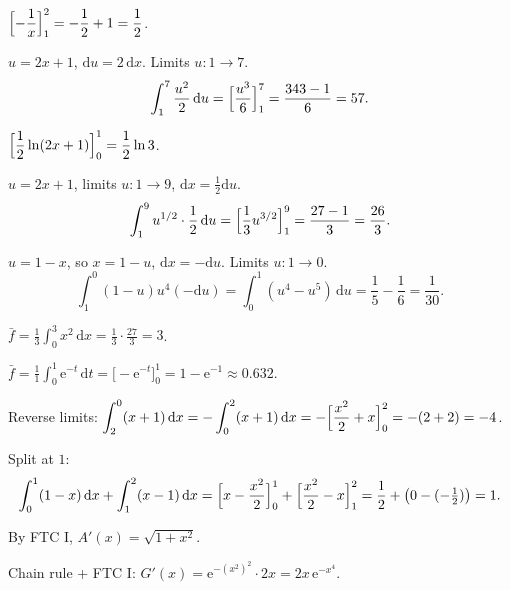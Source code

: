 \begin{solutions}
  \item $\displaystyle\Bigl[-\frac{1}{x}\Bigr]_{1}^{2}
        =-\frac{1}{2}+1=\frac{1}{2}$.

  \item $u=2x+1$, $\mathrm{d}u=2\,\mathrm{d}x$. Limits $u:1\to 7$.
        \[
          \int_{1}^{7} \frac{u^{2}}{2}\,\mathrm{d}u
            =\Bigl[\frac{u^{3}}{6}\Bigr]_{1}^{7}=\frac{343-1}{6}=57 .
        \]

  \item $\displaystyle\Bigl[\frac{1}{2}\ln(2x+1)\Bigr]_{0}^{1}
        =\frac{1}{2}\ln 3$.

  \item $u=2x+1$, limits $u:1\to 9$, $\mathrm{d}x=\frac{1}{2}\mathrm{d}u$.
        \[
          \int_{1}^{9} u^{1/2}\cdot\frac{1}{2}\,\mathrm{d}u
            =\Bigl[\frac{1}{3}u^{3/2}\Bigr]_{1}^{9}=\frac{27-1}{3}=\frac{26}{3} .
        \]

  \item $u=1-x$, so $x=1-u$, $\mathrm{d}x=-\mathrm{d}u$. Limits $u:1\to 0$.
        \[
          \int_{1}^{0} (1-u)u^{4}(-\mathrm{d}u)
            =\int_{0}^{1} (u^{4}-u^{5})\,\mathrm{d}u
            =\frac{1}{5}-\frac{1}{6}=\frac{1}{30} .
        \]

  \item $\displaystyle\bar f=\frac{1}{3}\int_{0}^{3} x^{2}\,\mathrm{d}x
        =\frac{1}{3}\cdot\frac{27}{3}=3$.

  \item $\displaystyle\bar f=\frac{1}{1}\int_{0}^{1} \mathrm{e}^{-t}\,\mathrm{d}t
        =\bigl[-\mathrm{e}^{-t}\bigr]_{0}^{1}=1-\mathrm{e}^{-1}\approx 0.632$.

  \item Reverse limits:
        $\displaystyle\int_{2}^{0} (x+1)\,\mathrm{d}x
        =-\int_{0}^{2} (x+1)\,\mathrm{d}x
        =-\Bigl[\frac{x^{2}}{2}+x\Bigr]_{0}^{2}=-(2+2)=-4$.

  \item Split at $1$:
        \[
          \int_{0}^{1} (1-x)\,\mathrm{d}x+\int_{1}^{2} (x-1)\,\mathrm{d}x
          =\Bigl[x-\frac{x^{2}}{2}\Bigr]_{0}^{1}
           +\Bigl[\frac{x^{2}}{2}-x\Bigr]_{1}^{2}
          =\frac{1}{2}+\bigl(0-(-\tfrac12)\bigr)=1 .
        \]

  \item By FTC I, $A'(x)=\sqrt{1+x^{2}}$.

  \item Chain rule + FTC I:
        $G'(x)=\mathrm{e}^{-(x^{2})^{2}}\cdot 2x=2x\,\mathrm{e}^{-x^{4}}$.


\end{solutions}

